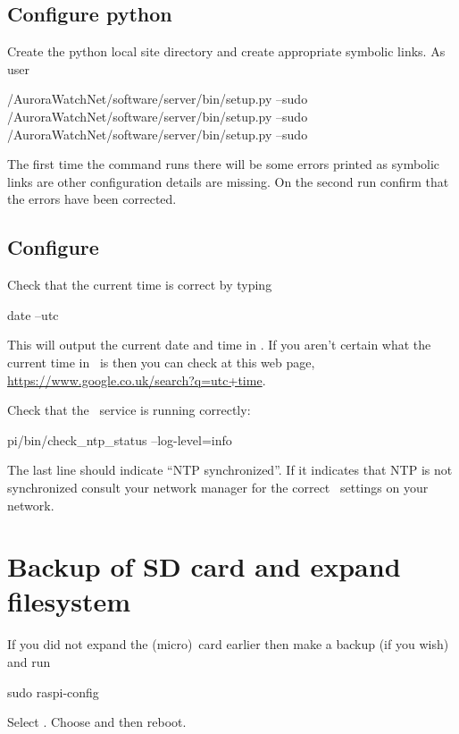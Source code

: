 \subsection{Configure python}

Create the python local site directory and create appropriate symbolic
links. As user \piUser
\begin{Cmd}
\mytilde/AuroraWatchNet/software/server/bin/setup.py --sudo
\mytilde/AuroraWatchNet/software/server/bin/setup.py --sudo
\mytilde/AuroraWatchNet/software/server/bin/setup.py --sudo
\end{Cmd}

The first time the command runs there will be some errors printed as
symbolic links are other configuration details are missing. On the
second run confirm that the errors have been corrected.


\subsection{Configure \protect{}}
Check that the current time is correct by typing
\begin{Cmd}
date --utc
\end{Cmd}
This will output the current date and time in \utc. If you aren't
certain what the current time in \utc\ is then you can check at this
web page, \url{https://www.google.co.uk/search?q=utc+time}.

Check that the \ntp\ service is running correctly:
\begin{Cmd}
\mytilde{}pi/bin/check_ntp_status --log-level=info
\end{Cmd}
The last line should indicate ``NTP synchronized''. If it indicates
that NTP is not synchronized consult your network manager for the
correct \ntp\ settings on your network.



\section{Backup of SD card and expand filesystem}

If you did not expand the (micro)\sd\ card earlier then make a backup
(if you wish) and run
\begin{Cmd}
sudo raspi-config
\end{Cmd}
Select . Choose  and then reboot.

